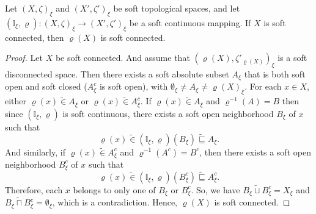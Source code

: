 \documentclass[preprint,12pt]{elsarticle}
\begin{document}
\begin{thm}\label{softcontconnectted}
Let \( (X, \zeta)_\xi \) and \( (X', \zeta')_{\xi} \) be soft topological spaces, and let $(\mathbb{I}_\xi,\varrho)\colon (X, \zeta)_\xi \to  (X', \zeta')_\xi $ be a soft continuous mapping.
If $X$ is soft connected, then $\varrho(X)$ is soft connected.
\end{thm}
\begin{proof}
 Let $X$ be soft connected. And assume that $(\varrho(X),\zeta'_{\varrho(X)})_\xi$ is a soft disconnected space. Then  there exists a soft absolute subset $A_\xi$  that is both soft open and soft closed (${A}_\xi^c$ is soft open), with $\emptyset_\xi \neq A_\xi \neq {\varrho(X)}_\xi$.  For each $x \in X$, either $\varrho(x) \widetilde{\in} A_\xi$ or $\varrho(x) \widetilde{\in} A_\xi^c$.
 If $\varrho(x) \widetilde{\in} A_\xi$ and $\varrho^{-1}(A) = B$  then since $(\mathbb{I}_\xi,\varrho )$ is soft continuous, there exists a soft open neighborhood  $B_\xi$  of $x$ such that  $$\varrho (x) \widetilde{\in}(\mathbb{I}_\xi,\varrho)( B_\xi)\widetilde{\sqsubseteq}A_\xi.$$
 And similarly, if  $\varrho(x) \widetilde{\in} A_\xi^c$  and $\varrho^{-1}(A^c) = B^c$, then there exists a soft open neighborhood  $ B_\xi^c$  of $x$ such that  $$\varrho (x) \widetilde{\in}(\mathbb{I}_\xi,\varrho)(  B_\xi^c)\widetilde{\sqsubseteq} A_\xi^c.$$
 Therefore, each $x$ belongs to only one of $B_\xi$ or $ B_\xi^c$.
 So, we have $B_\xi\widetilde{\sqcup} B_\xi^c=X_\xi$ and $B_\xi\widetilde{\sqcap} B_\xi^c=\emptyset_\xi$, which is a contradiction. Hence, $\varrho(X)$ is soft connected.

\end{proof}
\end{document}
